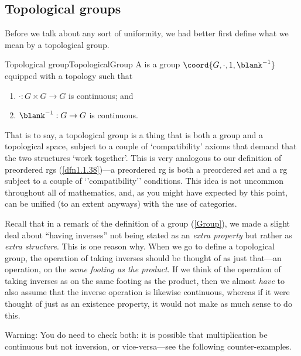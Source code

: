 \subsection{Topological groups}

Before we talk about any sort of uniformity, we had better first define what we mean by a topological group.
\begin{dfn}{Topological group}{TopologicalGroup}
A  is a group $\coord{G,\cdot ,1,\blank ^{-1}}$ equipped with a topology such that
\begin{enumerate}
\item $\cdot :G\times G\rightarrow G$ is continuous; and
\item $\blank ^{-1}:G\rightarrow G$ is continuous.
\end{enumerate}
\begin{rmk}
That is to say, a topological group is a thing that is both a group and a topological space, subject to a couple of `compatibility' axioms that demand that the two structures `work together'.  This is very analogous to our definition of preordered rgs (\cref{dfn1.1.38})---a preordered rg is both a preordered set and a rg subject to a couple of `'compatibility'' conditions.  This idea is not uncommon throughout all of mathematics, and, as you might have expected by this point, can be unified (to an extent anyways) with the use of categories.
\end{rmk}
\begin{rmk}
Recall that in a remark of the definition of a group (\cref{Group}), we made a slight deal about ``having inverses'' not being stated as an \emph{extra property} but rather as \emph{extra structure}.  This is one reason why.  When we go to define a topological group, the operation of taking inverses should be thought of as just that---an operation, on the \emph{same footing as the product}.  If we think of the operation of taking inverses as on the same footing as the product, then we almost \emph{have} to also assume that the inverse operation is likewise continuous, whereas if it were thought of just as an existence property, it would not make as much sense to do this.
\end{rmk}
\begin{wrn}
Warning:  You do need to check both:  it is possible that multiplication be continuous but not inversion, or vice-versa---see the following counter-examples.
\end{wrn}
\end{dfn}
